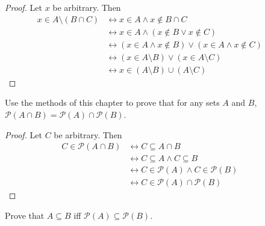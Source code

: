 \begin{proof}
    Let $x$ be arbitrary. Then 
    \begin{align*}
        x \in A \setminus (B \cap C) & \leftrightarrow x \in A \wedge x \not \in B \cap C                               &  & \\
                                     & \leftrightarrow x \in A \wedge (x \not \in B \vee x \not \in C)                  &  & \\
                                     & \leftrightarrow (x \in A \wedge x \not \in B) \vee (x \in A \wedge x \not \in C) &  & \\
                                     & \leftrightarrow (x \in A \setminus B) \vee (x \in A \setminus C)                 &  & \\
                                     & \leftrightarrow x \in (A \setminus B) \cup (A \setminus C) 
    \end{align*}
\end{proof}

\begin{tcolorbox}[title=Problem 7, breakable]
    Use the methods of this chapter to prove that for any sets $A$ and $B$,
    $\mathcal{P}(A \cap B) = \mathcal{P}(A) \cap \mathcal{P}(B)$.
\end{tcolorbox}

\begin{proof}
    Let $C$ be arbitrary. Then
    \begin{align*}
        C \in \mathcal{P}(A \cap B) & \leftrightarrow C \subseteq A \cap B                             &  & \\
                                    & \leftrightarrow C \subseteq A \wedge C \subseteq B               &  & \\
                                    & \leftrightarrow C \in \mathcal{P}(A) \wedge C \in \mathcal{P}(B) &  & \\
                                    & \leftrightarrow C \in \mathcal{P}(A) \cap \mathcal{P}(B)
    \end{align*}
\end{proof}

\begin{tcolorbox}[title=Problem 8, breakable]
    Prove that $A \subseteq B$ iff $\mathcal{P}(A) \subseteq \mathcal{P}(B)$.
\end{tcolorbox}

